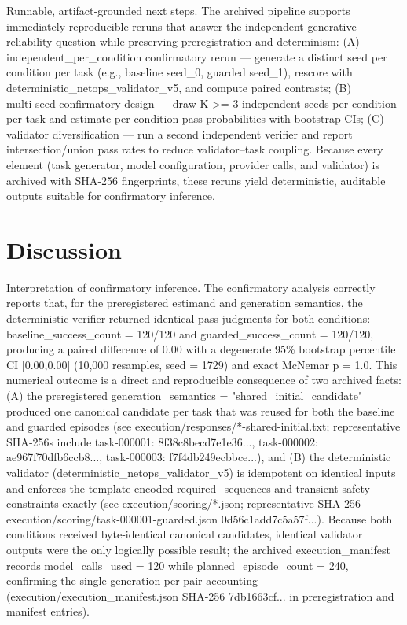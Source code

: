 \documentclass[conference]{IEEEtran}
\begin{document}
Runnable, artifact‑grounded next steps. The archived pipeline supports immediately reproducible reruns that answer the independent generative reliability question while preserving preregistration and determinism: (A) independent\_per\_condition confirmatory rerun --- generate a distinct seed per condition per task (e.g., baseline seed\_0, guarded seed\_1), rescore with deterministic\_netops\_validator\_v5, and compute paired contrasts; (B) multi‑seed confirmatory design --- draw K >= 3 independent seeds per condition per task and estimate per‑condition pass probabilities with bootstrap CIs; (C) validator diversification --- run a second independent verifier and report intersection/union pass rates to reduce validator--task coupling. Because every element (task generator, model configuration, provider calls, and validator) is archived with SHA‑256 fingerprints, these reruns yield deterministic, auditable outputs suitable for confirmatory inference.

\section{Discussion}
Interpretation of confirmatory inference. The confirmatory analysis correctly reports that, for the preregistered estimand and generation semantics, the deterministic verifier returned identical pass judgments for both conditions: baseline\_success\_count = 120/120 and guarded\_success\_count = 120/120, producing a paired difference of 0.00 with a degenerate 95\% bootstrap percentile CI [0.00,0.00] (10,000 resamples, seed = 1729) and exact McNemar p = 1.0. This numerical outcome is a direct and reproducible consequence of two archived facts: (A) the preregistered generation\_semantics = "shared\_initial\_candidate" produced one canonical candidate per task that was reused for both the baseline and guarded episodes (see execution/responses/*-shared-initial.txt; representative SHA‑256s include task-000001: 8f38c8becd7e1e36..., task-000002: ae967f70dfb6ccb8..., task-000003: f7f4db249ecbbce...), and (B) the deterministic validator (deterministic\_netops\_validator\_v5) is idempotent on identical inputs and enforces the template‑encoded required\_sequences and transient safety constraints exactly (see execution/scoring/*.json; representative SHA‑256 execution/scoring/task-000001-guarded.json 0d56c1add7c5a57f...). Because both conditions received byte‑identical canonical candidates, identical validator outputs were the only logically possible result; the archived execution\_manifest records model\_calls\_used = 120 while planned\_episode\_count = 240, confirming the single‑generation per pair accounting (execution/execution\_manifest.json SHA‑256 7db1663cf... in preregistration and manifest entries).
\end{document}
